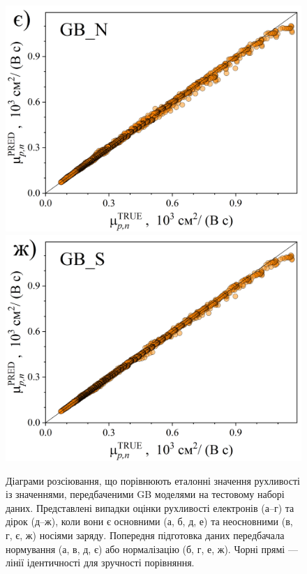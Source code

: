 \documentclass[12pt,a4paper,titlepage,oneside]{book}
\numberwithin{equation}{part}
\begin{document}
\begin{figure}
     \includegraphics[width=0.35\linewidth]{GBNpn.png}\kern 20pt
     \includegraphics[width=0.35\linewidth]{GBSpn.png}
	  \caption{Діаграми розсіювання, що порівнюють еталонні значення рухливості із значеннями, передбаченими GB моделями
       на тестовому наборі даних.
       Представлені випадки оцінки рухливості електронів (а--г) та дірок (д--ж), коли вони є
       основними (а, б, д, е) та неосновними (в, г, є, ж) носіями заряду.
       Попередня підготовка даних передбачала нормування (а, в, д, є) або нормалізацію (б, г, е, ж).
       Чорні прямі --- лінії ідентичності для зручності порівняння.
}\label{figGB}
\end{figure}
\end{document}
